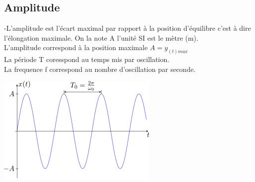 \documentclass[11pt]{article}
\begin{document}
\subsection{Amplitude}
-L'amplitude est l'écart maximal par rapport à la position d'équilibre c'est à dire l'élongation maximale. On la note A l'unité SI est le mètre (m).\\
L'amplitude correspond à la position maximale $ A = y_{(t)max}$\\
La période T coresspond au temps mis par oscillation.\\
La frequence f correspond au nombre d'oscillation par seconde.
\begin{center}
    \includegraphics{oscillateur_harmonique.png}
\end{center}

\newpage
\end{document}
